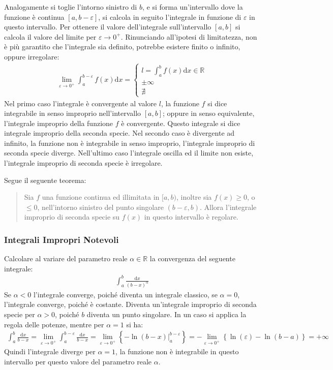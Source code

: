 \documentclass{article}
\numberwithin{equation}{subsection}
\begin{document}
Analogamente si toglie l'intorno sinistro di $b$, e si forma un'intervallo dove la funzione è continua $[a, b-\varepsilon]$, si calcola in seguito l'integrale in funzione di $\varepsilon$ in questo intervallo. Per ottenere il valore dell'integrale sull'intervallo $[a,b]$ si calcola il valore del limite per $\varepsilon\to0^+$. 
Rinunciando all'ipotesi di limitatezza, non è più garantito che l'integrale sia definito, potrebbe esistere finito o infinito, oppure irregolare:
\begin{gather}
    \lim_{\varepsilon\to0^+}\displaystyle\int_a^{b-\varepsilon}f(x)\mathrm{d}x=
    \begin{cases}
        l=\displaystyle\int_a^bf(x)\mathrm{d}x\in\mathbb{R}\\
        \pm\infty\\
        \nexists
    \end{cases}
\end{gather}
Nel primo caso l'integrale è convergente al valore $l$, la funzione $f$ si dice integrabile in senso improprio nell'intervallo $[a,b]$; oppure in senso equivalente, l'integrale improprio della funzione $f$ è convergente. Questo integrale si dice integrale improprio della seconda specie. Nel secondo caso è divergente ad infinito, la funzione non è integrabile in senso improprio, l'integrale improprio di seconda specie diverge. Nell'ultimo caso l'integrale oscilla ed il limite non esiste, l'integrale improprio di seconda specie è irregolare. 

Segue il seguente teorema:
\begin{quotation}
    Sia $f$ una funzione continua ed illimitata in $[a,b)$, inoltre sia $f(x)\geq0$, o $\leq0$, nell'intorno sinistro del punto singolare $(b-\varepsilon, b)$. Allora l'integrale improprio di seconda specie su $f(x)$ in questo intervallo è regolare. 
\end{quotation}

\subsubsection{Integrali Impropri Notevoli}

Calcolare al variare del parametro reale $\alpha\in\mathbb{R}$ la convergenza del seguente integrale:
\begin{gather*}
\displaystyle\int_a^b\frac{\mathrm{d}x}{(b-x)^\alpha}    
\end{gather*}
Se $\alpha<0$ l'integrale converge, poiché diventa un integrale classico, se $\alpha=0$, l'integrale converge, poiché è costante. Diventa un'integrale improprio di seconda specie per $\alpha>0$, poiché $b$ diventa un punto singolare. In un caso si applica la regola delle potenze, mentre per $\alpha=1$ si ha: 
\begin{gather*}
    \displaystyle\int_a^b\frac{\mathrm{d}x}{b-x}=
    \lim_{\varepsilon\to0^+}\displaystyle\int_a^{b-\varepsilon}\frac{\mathrm{d}x}{b-x}=
    \lim_{\varepsilon\to0^+}\left\{-\ln(b-x)\bigg|_a^{b-\varepsilon}\right\}=
    -\lim_{\varepsilon\to0^+}\left\{\ln(\varepsilon)-\ln(b-a)\right\}=+\infty
\end{gather*}
Quindi l'integrale diverge per $\alpha=1$, la funzione non è integrabile in questo intervallo per questo valore del parametro reale $\alpha$.
\end{document}
